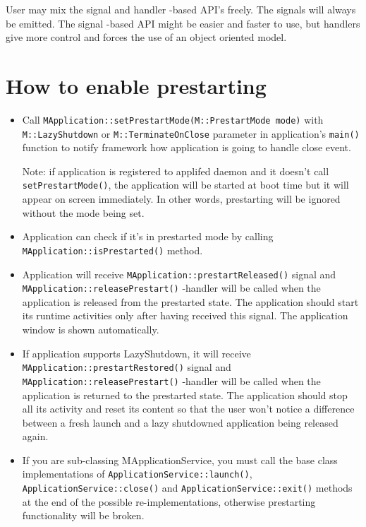 \documentclass[a4paper]{article}
\begin{document}
User may mix the signal and handler -based API's freely. The signals will always be emitted. The signal -based API might be easier and faster to use, but handlers give more control and forces the use of an object oriented model.

\section{How to enable prestarting}

\begin{itemize}

\item Call \texttt{MApplication::setPrestartMode(M::PrestartMode mode)} 
with \texttt{M::LazyShutdown} or 
\texttt{M::TerminateOnClose} parameter in application's \texttt{main()}
function to notify framework how application is going to handle close event.

Note: if application is registered to applifed daemon and it 
doesn't call \texttt{setPrestartMode()}, the application will be started at 
boot time but it will appear on screen immediately. In other words, prestarting 
will be ignored without the mode being set.

\item Application can check if it's in prestarted mode
by calling \texttt{MApplication::isPrestarted()} method.

\item Application will receive \texttt{MApplication::prestartReleased()} 
signal and \texttt{MApplication::releasePrestart()} -handler will be called when the application 
is released from the prestarted state. The application should start its runtime activities only after having received this signal. The application window is shown automatically.

\item If application supports LazyShutdown, it will receive  
\texttt{MApplication::prestartRestored()} signal and \texttt{MApplication::releasePrestart()} 
-handler will be called when the application is returned to the prestarted state. The application should stop all its activity and reset its content so that the user won't notice a difference between a fresh launch and a lazy shutdowned application being released again.

\item If you are sub-classing MApplicationService, you must call the base class implementations 
of \texttt{ApplicationService::launch()}, \texttt{ApplicationService::close()} and \texttt{ApplicationService::exit()} methods at the end of the possible re-implementations, otherwise prestarting functionality will be broken. 


\end{itemize}
\end{document}
